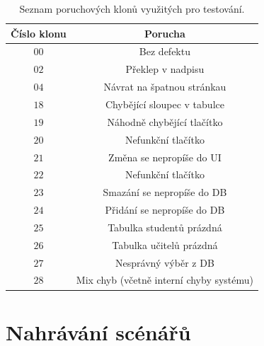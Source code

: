 \documentclass[czech, ma, kiv, he, iso690numb, pdf, viewonly]{fasthesis}
\begin{document}
    \begin{table}
        \begin{tabular}{|c|c|}
            \hline
            \textbf{Číslo klonu} & \textbf{Porucha} \\
            \hline
            \(00\) & Bez defektu \\
            \hline
            \(02\) & Překlep v nadpisu \\
            \hline
            \(04\) & Návrat na špatnou stránkau\\
            \hline
            \(18\) & Chybějící sloupec v tabulce \\
            \hline
            \(19\) & Náhodně chybějící tlačítko \\
            \hline
            \(20\) & Nefunkční tlačítko \\
            \hline
            \(21\) & Změna se nepropíše do UI \\
            \hline
            \(22\) & Nefunkční tlačítko \\
            \hline
            \(23\) & Smazání se nepropíše do DB \\
            \hline
            \(24\) & Přidání se nepropíše do DB \\
            \hline
            \(25\) & Tabulka studentů prázdná \\
            \hline
            \(26\) & Tabulka učitelů prázdná \\
            \hline
            \(27\) & Nesprávný výběr z DB \\
            \hline
            \(28\) & Mix chyb (včetně interní chyby systému) \\
            \hline
        \end{tabular}
        \centering
        \label{tab:clones}
        \caption{Seznam poruchových klonů využitých pro testování.}
    \end{table}

    \section{Nahrávání scénářů} \label{sec:recording}
\end{document}
